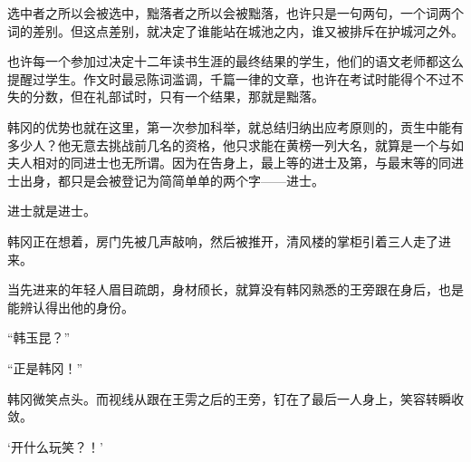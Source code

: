 选中者之所以会被选中，黜落者之所以会被黜落，也许只是一句两句，一个词两个词的差别。但这点差别，就决定了谁能站在城池之内，谁又被排斥在护城河之外。

也许每一个参加过决定十二年读书生涯的最终结果的学生，他们的语文老师都这么提醒过学生。作文时最忌陈词滥调，千篇一律的文章，也许在考试时能得个不过不失的分数，但在礼部试时，只有一个结果，那就是黜落。

韩冈的优势也就在这里，第一次参加科举，就总结归纳出应考原则的，贡生中能有多少人？他无意去挑战前几名的资格，他只求能在黄榜一列大名，就算是一个与如夫人相对的同进士也无所谓。因为在告身上，最上等的进士及第，与最末等的同进士出身，都只是会被登记为简简单单的两个字——进士。

进士就是进士。

韩冈正在想着，房门先被几声敲响，然后被推开，清风楼的掌柜引着三人走了进来。

当先进来的年轻人眉目疏朗，身材颀长，就算没有韩冈熟悉的王旁跟在身后，也是能辨认得出他的身份。

“韩玉昆？”

“正是韩冈！”

韩冈微笑点头。而视线从跟在王雱之后的王旁，钉在了最后一人身上，笑容转瞬收敛。

‘开什么玩笑？！’

